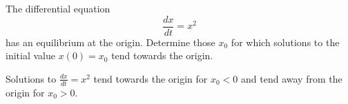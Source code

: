 \documentclass{ximera}
\begin{document}
\begin{exercise} \label{c3.3.4}
The differential equation
\[
\frac{dx}{dt} =  x^2
\]
has an equilibrium at the origin.  Determine
those $x_0$ for which solutions to the initial value $x(0)=x_0$ tend
towards the origin.

\begin{solution}
Solutions to $\frac{dx}{dt} = x^2$ tend towards the origin for $x_0 < 0$
and tend away from the origin for $x_0 > 0$.
\end{solution}
\end{exercise}
\end{document}
